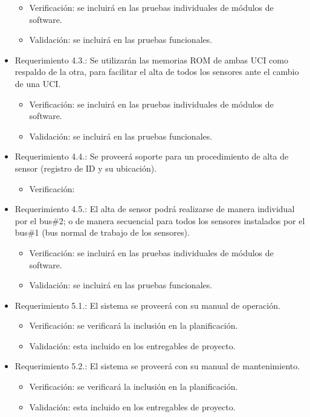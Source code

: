 \documentclass[
11pt, %
codirector, %
]{charter}
\begin{document}
\begin{itemize}
\begin{itemize}
	\item Verificación: se incluirá en las pruebas individuales de módulos de software. 
	\item Validación: se incluirá en las pruebas funcionales. 
\end{itemize}
\item Requerimiento 4.3.: Se utilizarán las memorias ROM de ambas UCI como respaldo de la otra, para facilitar el alta de todos los sensores ante el cambio de una UCI. 
\begin{itemize}
	\item Verificación: se incluirá en las pruebas individuales de módulos de software. 
	\item Validación: se incluirá en las pruebas funcionales. 
\end{itemize}
\item Requerimiento 4.4.: Se proveerá soporte para un procedimiento de alta de sensor (registro de ID y su ubicación).  
\begin{itemize}
	\item Verificación: 
\end{itemize}
\item Requerimiento 4.5.: El alta de sensor podrá realizarse de manera individual por el bus\#2; o de manera secuencial para todos los sensores instalados por el bus\#1 (bus normal de trabajo de los sensores). 
\begin{itemize}
	\item Verificación: se incluirá en las pruebas individuales de módulos de software. 
	\item Validación: se incluirá en las pruebas funcionales. 
\end{itemize}
\item Requerimiento 5.1.: El sistema se proveerá con su manual de operación. 
\begin{itemize}
	\item Verificación: se verificará la inclusión en la planificación.
	\item Validación: esta incluido en los entregables de proyecto. 
\end{itemize}
\item Requerimiento 5.2.: El sistema se proveerá con su manual de mantenimiento. 
\begin{itemize}
	\item Verificación: se verificará la inclusión en la planificación.
	\item Validación: esta incluido en los entregables de proyecto. 
\end{itemize}

\end{itemize}
\end{document}
